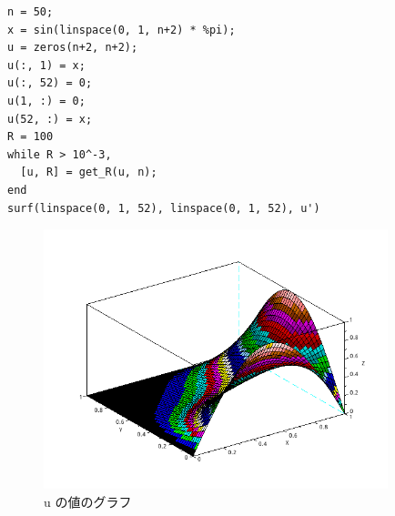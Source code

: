 \documentclass{scrartcl}
\begin{document}
\begin{verbatim}
n = 50;
x = sin(linspace(0, 1, n+2) * %pi);
u = zeros(n+2, n+2);
u(:, 1) = x;
u(:, 52) = 0;
u(1, :) = 0;
u(52, :) = x;
R = 100
while R > 10^-3,
  [u, R] = get_R(u, n);
end
surf(linspace(0, 1, 52), linspace(0, 1, 52), u')   
\end{verbatim}
\begin{figure}[htbp]
\centering
\includegraphics[width=10cm]{./2-1.png}
\caption{u の値のグラフ}
\end{figure}
\end{document}
